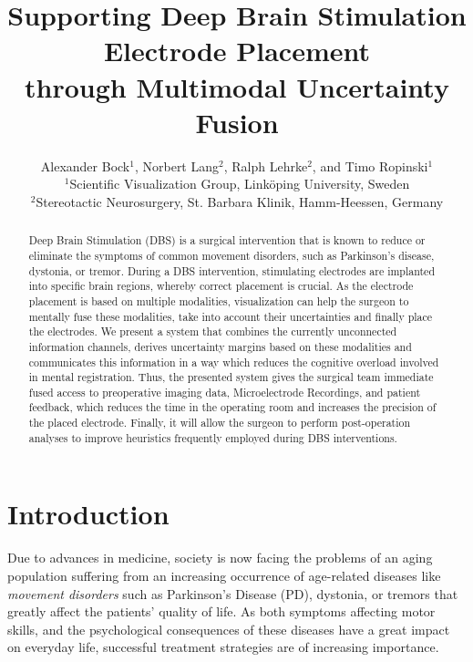 \documentclass{egpubl}
\title{Supporting Deep Brain Stimulation Electrode Placement\\through Multimodal Uncertainty Fusion}
\author[Bock et al.]{
Alexander Bock$^1$,
Norbert Lang$^2$,
Ralph Lehrke$^2$,
and Timo Ropinski$^1$\\
$^1$Scientific Visualization Group, Link\"oping University, Sweden\\
$^2$Stereotactic Neurosurgery, St. Barbara Klinik, Hamm-Heessen, Germany
}
\begin{document}
\maketitle
\begin{abstract}
Deep Brain Stimulation (DBS) is a surgical intervention that is known to reduce or eliminate the symptoms of common movement disorders, such as Parkinson's disease, dystonia, or tremor. During a DBS intervention, stimulating electrodes are implanted into specific brain regions, whereby correct placement is crucial. As the electrode placement is based on multiple modalities, visualization can help the surgeon to mentally fuse these modalities, take into account their uncertainties and finally place the electrodes. We present a system that combines the currently unconnected information channels, derives uncertainty margins based on these modalities and communicates this information in a way which reduces the cognitive overload involved in mental registration. Thus, the presented system gives the surgical team immediate fused access to preoperative imaging data, Microelectrode Recordings, and patient feedback, which reduces the time in the operating room and increases the precision of the placed electrode. Finally, it will allow the surgeon to perform post-operation analyses to improve heuristics frequently employed during DBS interventions.
\begin{classification}
\end{classification}
\end{abstract}

\section{Introduction}\label{sec:introduction}
Due to advances in medicine, society is now facing the problems of an aging population suffering from an increasing occurrence of age-related diseases like \emph{movement disorders} such as Parkinson's Disease (PD), dystonia, or tremors that greatly affect the patients' quality of life. As both symptoms affecting motor skills, and the psychological consequences of these diseases have a great impact on everyday life, successful treatment strategies are of increasing importance.
\end{document}
